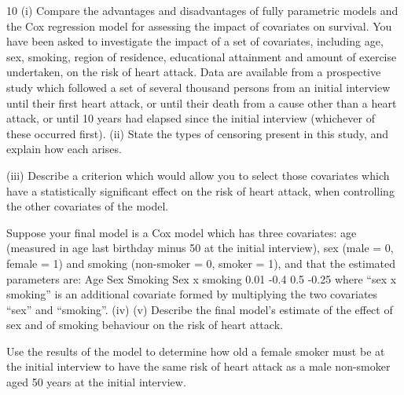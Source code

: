\documentclass[a4paper,12pt]{article}
\begin{document}
\begin{enumerate}
10
(i)
Compare the advantages and disadvantages of fully parametric models and the
Cox regression model for assessing the impact of covariates on survival. 
You have been asked to investigate the impact of a set of covariates, including age, sex, smoking, region of residence, educational attainment and amount of exercise undertaken, on the risk of heart attack. Data are available from a prospective study
which followed a set of several thousand persons from an initial interview until their first heart attack, or until their death from a cause other than a heart attack, or until 10 years had elapsed since the initial interview (whichever of these occurred first).
(ii) State the types of censoring present in this study, and explain how each arises.

(iii) Describe a criterion which would allow you to select those covariates which
have a statistically significant effect on the risk of heart attack, when
controlling the other covariates of the model.

Suppose your final model is a Cox model which has three covariates: age (measured
in age last birthday minus 50 at the initial interview), sex (male = 0, female = 1) and
smoking (non-smoker = 0, smoker = 1), and that the estimated parameters are:
Age
Sex
Smoking
Sex x smoking
0.01
-0.4
0.5
-0.25
where “sex x smoking” is an additional covariate formed by multiplying the two
covariates “sex” and “smoking”.
(iv)
(v)
Describe the final model’s estimate of the effect of sex and of smoking
behaviour on the risk of heart attack.

Use the results of the model to determine how old a female smoker must be at
the initial interview to have the same risk of heart attack as a male non-smoker
aged 50 years at the initial interview.


\end{enumerate}
\end{document}
